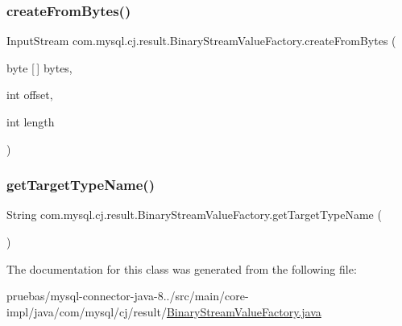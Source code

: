 \subsubsection{\texorpdfstring{create\+From\+Bytes()}{createFromBytes()}}
{\footnotesize\ttfamily Input\+Stream com.\+mysql.\+cj.\+result.\+Binary\+Stream\+Value\+Factory.\+create\+From\+Bytes (\begin{DoxyParamCaption}\item[{byte \mbox{[}$\,$\mbox{]}}]{bytes,  }\item[{int}]{offset,  }\item[{int}]{length }\end{DoxyParamCaption})}

\mbox{\label{classcom_1_1mysql_1_1cj_1_1result_1_1_binary_stream_value_factory_ae2de7b6e71fef5a012d3463964c78ffb}} 
\subsubsection{\texorpdfstring{get\+Target\+Type\+Name()}{getTargetTypeName()}}
{\footnotesize\ttfamily String com.\+mysql.\+cj.\+result.\+Binary\+Stream\+Value\+Factory.\+get\+Target\+Type\+Name (\begin{DoxyParamCaption}{ }\end{DoxyParamCaption})}



The documentation for this class was generated from the following file\+:\begin{DoxyCompactItemize}
\item 
pruebas/mysql-\/connector-\/java-\/8../src/main/core-\/impl/java/com/mysql/cj/result/\mbox{\hyperlink{_binary_stream_value_factory_8java}{Binary\+Stream\+Value\+Factory.\+java}}\end{DoxyCompactItemize}
